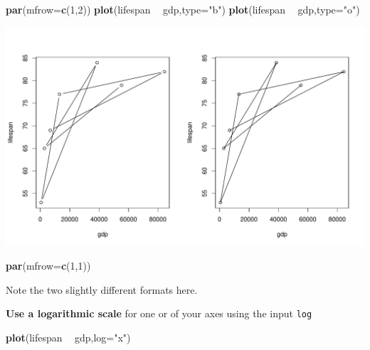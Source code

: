 \documentclass[
]{book}
\newenvironment{Shaded}{\begin{snugshade}}{\end{snugshade}}
\newcommand{\DataTypeTok}[1]{\textcolor[rgb]{0.13,0.29,0.53}{#1}}
\newcommand{\DecValTok}[1]{\textcolor[rgb]{0.00,0.00,0.81}{#1}}
\newcommand{\KeywordTok}[1]{\textcolor[rgb]{0.13,0.29,0.53}{\textbf{#1}}}
\newcommand{\NormalTok}[1]{#1}
\newcommand{\OperatorTok}[1]{\textcolor[rgb]{0.81,0.36,0.00}{\textbf{#1}}}
\newcommand{\StringTok}[1]{\textcolor[rgb]{0.31,0.60,0.02}{#1}}
\begin{document}
\begin{Shaded}
\begin{Highlighting}[]
\KeywordTok{par}\NormalTok{(}\DataTypeTok{mfrow=}\KeywordTok{c}\NormalTok{(}\DecValTok{1}\NormalTok{,}\DecValTok{2}\NormalTok{))}
\KeywordTok{plot}\NormalTok{(lifespan }\OperatorTok{~}\StringTok{ }\NormalTok{gdp,}\DataTypeTok{type=}\StringTok{"b"}\NormalTok{)}
\KeywordTok{plot}\NormalTok{(lifespan }\OperatorTok{~}\StringTok{ }\NormalTok{gdp,}\DataTypeTok{type=}\StringTok{"o"}\NormalTok{)}
\end{Highlighting}
\end{Shaded}

\includegraphics{figures/unnamed-chunk-115-1.pdf}

\begin{Shaded}
\begin{Highlighting}[]
\KeywordTok{par}\NormalTok{(}\DataTypeTok{mfrow=}\KeywordTok{c}\NormalTok{(}\DecValTok{1}\NormalTok{,}\DecValTok{1}\NormalTok{))}
\end{Highlighting}
\end{Shaded}

Note the two slightly different formats here.

\textbf{Use a logarithmic scale} for one or of your axes using the input \texttt{log}

\begin{Shaded}
\begin{Highlighting}[]
\KeywordTok{plot}\NormalTok{(lifespan }\OperatorTok{~}\StringTok{ }\NormalTok{gdp,}\DataTypeTok{log=}\StringTok{"x"}\NormalTok{)}
\end{Highlighting}
\end{Shaded}
\end{document}
